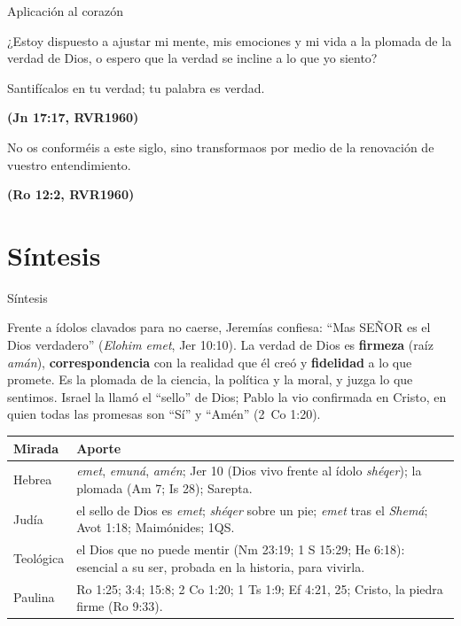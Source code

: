 \documentclass[hyperref={bookmarks=false},aspectratio=169]{beamer}
\newcommand{\SENOR}{S{\fontsize{0.78em}{1em}\selectfont EÑOR}}
\newcommand{\fuente}[1]{\par\hfill{\upshape\bfseries\footnotesize\textcolor{azul}{#1}}}
\newcommand{\destacar}[1]{\textbf{\textcolor{azul}{#1}}}
\begin{document}
\begin{frame}{Aplicación al corazón}
\begin{tcolorbox}[colback=papiro,colframe=dorado,boxrule=1.4pt,arc=3pt]
\centering\large ¿Estoy dispuesto a ajustar mi mente, mis emociones y mi vida a la plomada de la verdad de Dios, o espero que la verdad se incline a lo que yo siento?
\end{tcolorbox}\par\medskip
\begin{cita}Santifícalos en tu verdad; tu palabra es verdad.\fuente{(Jn 17:17, RVR1960)}\end{cita}
\begin{cita}No os conforméis a este siglo, sino transformaos por medio de la renovación de vuestro entendimiento.\fuente{(Ro 12:2, RVR1960)}\end{cita}
\end{frame}

\section{Síntesis}

\begin{frame}{Síntesis}
\begin{tcolorbox}[colback=papiro,colframe=azul,boxrule=1pt,arc=3pt]
\small Frente a ídolos clavados para no caerse, Jeremías confiesa: ``Mas \SENOR{} es el Dios verdadero'' (\emph{Elohim emet}, Jer 10:10). La verdad de Dios es \destacar{firmeza} (raíz \emph{amán}), \destacar{correspondencia} con la realidad que él creó y \destacar{fidelidad} a lo que promete. Es la plomada de la ciencia, la política y la moral, y juzga lo que sentimos. Israel la llamó el ``sello'' de Dios; Pablo la vio confirmada en Cristo, en quien todas las promesas son ``Sí'' y ``Amén'' (2~Co 1:20).
\end{tcolorbox}
\scriptsize\renewcommand{\arraystretch}{1.15}
\begin{tabular}{@{}>{\RaggedRight\arraybackslash}p{2.4cm}>{\RaggedRight\arraybackslash}p{9.4cm}@{}}
\toprule
\textbf{Mirada} & \textbf{Aporte} \\ \midrule
Hebrea & \emph{emet}, \emph{emuná}, \emph{amén}; Jer 10 (Dios vivo frente al ídolo \emph{shéqer}); la plomada (Am 7; Is 28); Sarepta. \\
Judía & el sello de Dios es \emph{emet}; \emph{shéqer} sobre un pie; \emph{emet} tras el \emph{Shemá}; Avot 1:18; Maimónides; 1QS. \\
Teológica & el Dios que no puede mentir (Nm 23:19; 1 S 15:29; He 6:18): esencial a su ser, probada en la historia, para vivirla. \\
Paulina & Ro 1:25; 3:4; 15:8; 2 Co 1:20; 1 Ts 1:9; Ef 4:21, 25; Cristo, la piedra firme (Ro 9:33). \\
\bottomrule
\end{tabular}
\end{frame}
\end{document}

